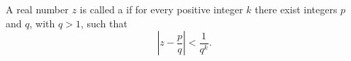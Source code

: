 A real number $z$ is called a  if for every positive integer $k$ there exist integers $p$ and $q$, with $q > 1$, such that
$$\left| z - \frac{p}{q} \right| < \frac{1}{q^k}.$$
